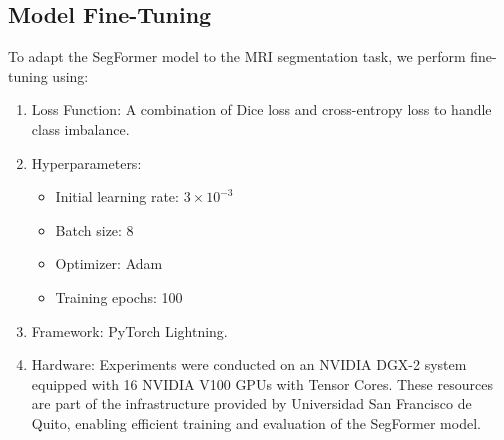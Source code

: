 \documentclass[journal]{IEEEtran}
\begin{document}
\subsection{Model Fine-Tuning}
To adapt the SegFormer model to the MRI segmentation task, we perform fine-tuning using:
\begin{enumerate}
\item Loss Function: A combination of Dice loss and cross-entropy loss to handle class imbalance.

\item Hyperparameters:
  \begin{itemize}
    \item Initial learning rate: $3\times10^{-3}$ 
    \item Batch size: 8
    \item Optimizer: Adam
    \item Training epochs: 100
  \end{itemize}
\item Framework: PyTorch Lightning.
\item Hardware: Experiments were conducted on an NVIDIA DGX-2 system equipped with 16 NVIDIA V100 GPUs with Tensor Cores. These resources are part of the infrastructure provided by Universidad San Francisco de Quito, enabling efficient training and evaluation of the SegFormer model.
\end{enumerate}
\end{document}
